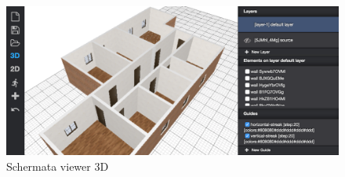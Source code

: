 
\begin{figure}[htbp] %
   \centering
   \includegraphics[width=1\linewidth]{images/3d}
   \caption{Schermata viewer 3D }
   \label{fig:viewer3D}
\end{figure}
\newpage
